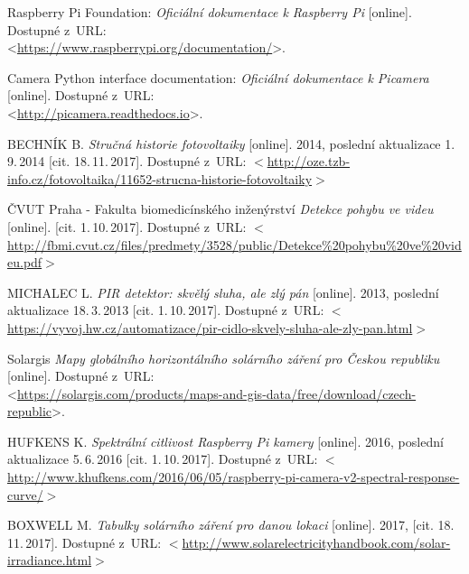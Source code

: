

\begin{literatura}{99}
	
		Raspberry Pi Foundation:
    \emph{Oficiální dokumentace k Raspberry Pi}\/ [online].
    Dostupné z~URL:\\
    <\url{https://www.raspberrypi.org/documentation/}>.
    
		Camera Python interface documentation:
    \emph{Oficiální dokumentace k Picamera}\/ [online].
    Dostupné z~URL:\\
    <\url{http://picamera.readthedocs.io}>.

    BECHNÍK B.
    \emph{Stručná historie fotovoltaiky}\/ [online].
    2014, poslední aktualizace 1.\,9.\,2014 [cit. 18.\,11.\,2017].
    Dostupné z~URL:
    \(<\)\url{http://oze.tzb-info.cz/fotovoltaika/11652-strucna-historie-fotovoltaiky}\(>\)

    ČVUT Praha - Fakulta biomedicínského inženýrství
    \emph{Detekce pohybu ve videu}\/ [online].
    [cit. 1.\,10.\,2017].
    Dostupné z~URL:
    \(<\)\url{http://fbmi.cvut.cz/files/predmety/3528/public/Detekce\%20pohybu\%20ve\%20videu.pdf}\(>\)

    MICHALEC L.
    \emph{PIR detektor: skvělý sluha, ale zlý pán}\/ [online].
    2013, poslední aktualizace 18.\,3.\,2013 [cit. 1.\,10.\,2017].
    Dostupné z~URL:
    \(<\)\url{https://vyvoj.hw.cz/automatizace/pir-cidlo-skvely-sluha-ale-zly-pan.html}\(>\)

		Solargis
    \emph{Mapy globálního horizontálního solárního záření pro Českou republiku}\/ [online].
    Dostupné z~URL:\\
    <\url{https://solargis.com/products/maps-and-gis-data/free/download/czech-republic}>.

    HUFKENS K.
    \emph{Spektrální citlivost Raspberry Pi kamery}\/ [online].
    2016, poslední aktualizace 5.\,6.\,2016 [cit. 1.\,10.\,2017].
    Dostupné z~URL:
    \(<\)\url{http://www.khufkens.com/2016/06/05/raspberry-pi-camera-v2-spectral-response-curve/}\(>\)
    
    BOXWELL M.
    \emph{Tabulky solárního záření pro danou lokaci}\/ [online].
    2017, [cit. 18.\,11.\,2017].
    Dostupné z~URL:
    \(<\)\url{http://www.solarelectricityhandbook.com/solar-irradiance.html}\(>\)
    
    

\end{literatura}


